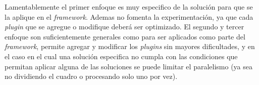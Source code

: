 Lamentablemente el primer enfoque es muy especifico de la solución para que se
la aplique en el \emph{framework}. Ademas no fomenta la experimentación, ya que cada
\emph{plugin} que se agregue o modifique deberá ser optimizado. El segundo y
tercer enfoque son suficientemente generales como para ser aplicados como parte
del \emph{framework}, permite agregar y modificar los \emph{plugins} sin mayores
dificultades, y en el caso en el cual una solución especifica no cumpla con las
condiciones que permitan aplicar alguna de las soluciones se puede limitar el
paralelismo (ya sea no dividiendo el cuadro o procesando solo uno por vez).
